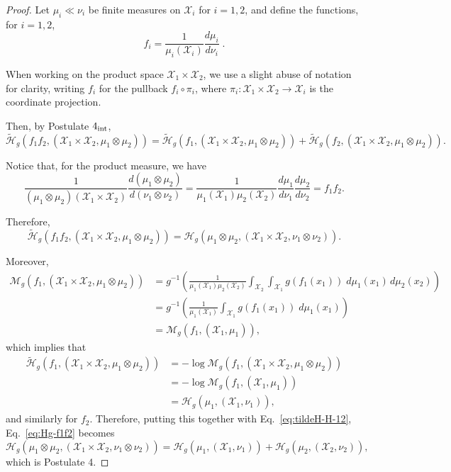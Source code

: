\documentclass[reqno]{amsart}
\begin{document}
\begin{proof}
Let $\mu_i\ll\nu_i$ be finite measures on $\mathcal{X}_i$ for $i=1,2$,
and define the functions, for $i=1,2$,
$$
f_i = \frac1{\mu_i(\mathcal{X}_i)}\frac{d\mu_i}{d\nu_i} \;.
$$

When working on the product space $\mathcal{X}_1\times\mathcal{X}_2$, we use a slight abuse of notation for clarity, writing $f_i$ for the pullback $f_i\circ\pi_i$, where
$
\pi_i:\mathcal X_1\times\mathcal X_2\to\mathcal X_i
$
is the coordinate projection.


Then, by Postulate $4_{\rm int}$, 
 \begin{equation}
 \label{eq:Hg-f1f2}
    \widetilde{\mathcal{H}}_g(f_1f_2,(\mathcal{X}_1 \times \mathcal{X}_2,\mu_1 \otimes \mu_2))
    =
    \widetilde{\mathcal{H}}_g(f_1,(\mathcal{X}_1 \times \mathcal{X}_2,\mu_1 \otimes \mu_2))
    +
    \widetilde{\mathcal{H}}_g(f_2,(\mathcal{X}_1 \times \mathcal{X}_2,\mu_1 \otimes \mu_2)).
\end{equation}


Notice that, for the product measure, we have
$$
\frac{1}{(\mu_1\otimes\mu_2)(\mathcal{X}_1 \times \mathcal{X}_2)}
\frac{d(\mu_1\otimes\mu_2)}{d(\nu_1\otimes\nu_2)}
=
\frac{1}{\mu_1(\mathcal{X}_1)\mu_2(\mathcal{X}_2)}
\frac{d\mu_1}{d\nu_1}
\frac{d\mu_2}{d\nu_2}
=
f_1 f_2.
$$

Therefore, 
\begin{equation}
\label{eq:tildeH-H-12}
\widetilde{\mathcal{H}}_g(f_1f_2,(\mathcal{X}_1 \times \mathcal{X}_2,\mu_1 \otimes \mu_2))
= 
\mathcal{H}_g(\mu_1 \otimes \mu_2,(\mathcal{X}_1 \times \mathcal{X}_2,\nu_1 \otimes \nu_2)).
\end{equation}

Moreover,
$$
\begin{aligned}
\mathcal{M}_g(f_1,(\mathcal{X}_1\times \mathcal{X}_2,\mu_1\otimes\mu_2))
&=
g^{-1}
\left(
\frac{1}{\mu_1(\mathcal{X}_1)\mu_2(\mathcal{X}_2)}
\int_{\mathcal{X}_2} \int_{\mathcal{X}_1}
g(f_1(x_1)) \; d\mu_1(x_1)\,d\mu_2(x_2)
\right) \\
&=
g^{-1}
\left(
\frac{1}{\mu_1(\mathcal{X}_1)}
\int_{\mathcal{X}_1} 
g(f_1(x_1)) \; d\mu_1(x_1) \right)\\
&=
\mathcal{M}_g(f_1,(\mathcal{X}_1,\mu_1)), 
\end{aligned}
$$
which implies that
$$
\begin{aligned}
\widetilde{\mathcal{H}}_g(f_1,(\mathcal{X}_1\times \mathcal{X}_2,\mu_1\otimes\mu_2))
&=
-\log \mathcal{M}_g(f_1,(\mathcal{X}_1\times \mathcal{X}_2,\mu_1\otimes\mu_2)) \\
&=
-\log \mathcal{M}_g(f_1,(\mathcal{X}_1,\mu_1)) \\
&=
\mathcal{H}_g(\mu_1,(\mathcal{X}_1,\nu_1)), 
\end{aligned}
$$
and similarly for $f_2$. 
Therefore, putting this together with Eq.~\ref{eq:tildeH-H-12}, Eq.~\ref{eq:Hg-f1f2} becomes
$$
\mathcal{H}_g(\mu_1 \otimes \mu_2,(\mathcal{X}_1 \times \mathcal{X}_2,\nu_1 \otimes \nu_2))
= \mathcal{H}_g(\mu_1,(\mathcal{X}_1,\nu_1)) 
+
\mathcal{H}_g(\mu_2,(\mathcal{X}_2,\nu_2)),
$$
which is Postulate 4.
\end{proof}
\end{document}
